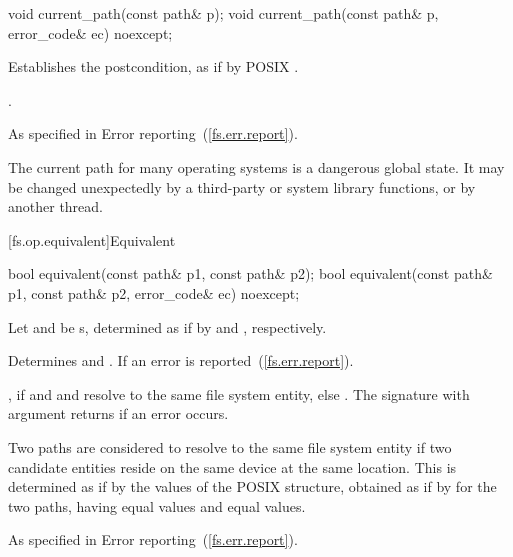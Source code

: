 %
\begin{itemdecl}
void current_path(const path& p);
void current_path(const path& p, error_code& ec) noexcept;
\end{itemdecl}

\begin{itemdescr}
\pnum
\effects Establishes the postcondition, as if by POSIX .

\pnum
\postconditions {}.

\pnum
\throws As specified in Error reporting~(\ref{fs.err.report}).

\pnum
\begin{note} The current path for many operating systems is a dangerous
  global state. It may be changed unexpectedly by a third-party or system
  library functions, or by another thread. \end{note}
\end{itemdescr}

[fs.op.equivalent]{Equivalent}

%
\begin{itemdecl}
bool equivalent(const path& p1, const path& p2);
bool equivalent(const path& p1, const path& p2, error_code& ec) noexcept;
\end{itemdecl}

\begin{itemdescr}
\pnum
Let  and  be s, determined
as if by  and , respectively.

\pnum
\effects Determines  and .
If 
an error is reported~(\ref{fs.err.report}).

\pnum
\returns {}, if  and  and  resolve to the same file
  system entity, else . The signature with argument 
  returns  if an error occurs.

\pnum
Two paths are considered to resolve to the same file system entity if two
  candidate entities reside on the same device at the same location. This is
  determined as if by the values of the POSIX  structure,
  obtained as if by  for the two paths, having equal  values
  and equal  values.

\pnum
\throws As specified in Error reporting~(\ref{fs.err.report}).
\end{itemdescr}


